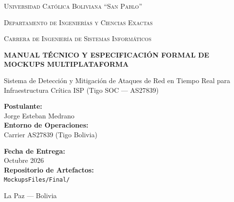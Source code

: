 \documentclass[11pt,a4paper]{article}
\begin{document}
\begin{titlepage}
    \centering
    \vspace*{1cm}
    {\scshape\Large Universidad Católica Boliviana ``San Pablo''\par}
    {\scshape\large Departamento de Ingenierías y Ciencias Exactas\par}
    {\scshape\normalsize Carrera de Ingeniería de Sistemas Informáticos\par}
    \vspace{2cm}
    
    {\Huge\bfseries\color{tigoDark} MANUAL TÉCNICO Y ESPECIFICACIÓN FORMAL DE MOCKUPS MULTIPLATAFORMA\par}
    \vspace{0.8cm}
    {\Large\color{slate700} Sistema de Detección y Mitigación de Ataques de Red en Tiempo Real para Infraestructura Crítica ISP (Tigo SOC --- AS27839)\par}
    \vspace{2.5cm}
    
    \noindent{}
    \vspace{2.5cm}
    
    \begin{minipage}{0.48\textwidth}
        \textbf{Postulante:}\\
        Jorge Esteban Medrano\\
        \textbf{Entorno de Operaciones:}\\
        Carrier AS27839 (Tigo Bolivia)
    \end{minipage}
    \hfill
    \begin{minipage}{0.48\textwidth}
        \flushright
        \textbf{Fecha de Entrega:}\\
        Octubre 2026\\
        \textbf{Repositorio de Artefactos:}\\
        \texttt{MockupsFiles/Final/}
    \end{minipage}
    
    \vfill
    {\small\color{slate500} La Paz --- Bolivia}
\end{titlepage}
\end{document}
